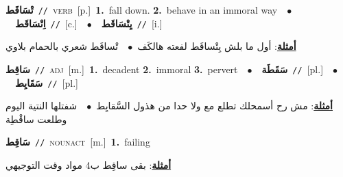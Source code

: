 \documentclass[10pt,a4paper,twoside]{article} %
\begin{document}
\begin{multicols}{2}
{\setlength\topsep{0pt}\textbf{\foreignlanguage{arabic}{تْسَاقَط}}\ {\color{gray}\texttt{//}\color{black}}\ \textsc{verb}\ [p.]\ \textbf{1.}~fall down.  \textbf{2.}~behave in an immoral way\ \ $\bullet$\ \ \setlength\topsep{0pt}\textbf{\foreignlanguage{arabic}{اِتْسَاقَط}}\ {\color{gray}\texttt{//}\color{black}}\ [c.]\ \ $\bullet$\ \ \setlength\topsep{0pt}\textbf{\foreignlanguage{arabic}{يِتْسَاقَط}}\ {\color{gray}\texttt{//}\color{black}}\ [i.]\  \begin{flushright}\color{gray}\foreignlanguage{arabic}{\textbf{\underline{\foreignlanguage{arabic}{أمثلة}}}: أول ما بلش يِتْساقَط لفعته هالكَف\ $\bullet$\ \  تْساقَط شعري بالحمام بلاوي}\end{flushright}\color{black}} \vspace{2mm}

{\setlength\topsep{0pt}\textbf{\foreignlanguage{arabic}{سَاقِط}}\ {\color{gray}\texttt{//}\color{black}}\ \textsc{adj}\ [m.]\ \textbf{1.}~decadent  \textbf{2.}~immoral  \textbf{3.}~pervert\ \ $\bullet$\ \ \setlength\topsep{0pt}\textbf{\foreignlanguage{arabic}{سَقَطَة}}\ {\color{gray}\texttt{//}\color{black}}\ [pl.]\ \ $\bullet$\ \ \setlength\topsep{0pt}\textbf{\foreignlanguage{arabic}{سَقَايِط}}\ {\color{gray}\texttt{//}\color{black}}\ [pl.]\  \begin{flushright}\color{gray}\foreignlanguage{arabic}{\textbf{\underline{\foreignlanguage{arabic}{أمثلة}}}: مش رح أسمحلك تطلع مع ولا حدا من هذول السَّقايِط\ $\bullet$\ \  شفتلها النتية اليوم وطلعت ساقْطِة}\end{flushright}\color{black}} \vspace{2mm}

{\setlength\topsep{0pt}\textbf{\foreignlanguage{arabic}{سَاقِط}}\ {\color{gray}\texttt{//}\color{black}}\ \textsc{noun\textunderscore act}\ [m.]\ \textbf{1.}~failing\  \begin{flushright}\color{gray}\foreignlanguage{arabic}{\textbf{\underline{\foreignlanguage{arabic}{أمثلة}}}: بقى ساقِط ب4 مواد وقت التوجيهي}\end{flushright}\color{black}} \vspace{2mm}


\end{multicols}
\end{document}
